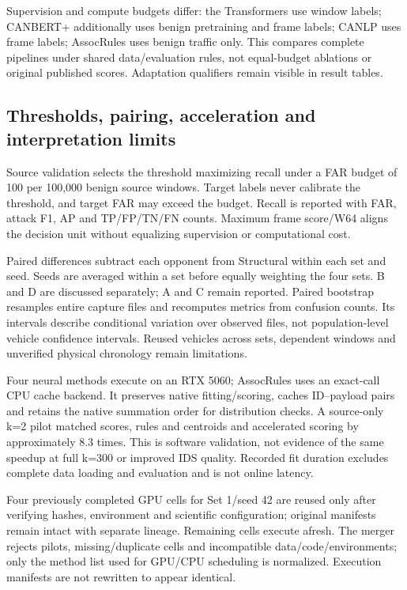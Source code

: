 \documentclass[12pt,a4paper,oneside,openany]{extbook}
\begin{document}
Supervision and compute budgets differ: the Transformers use window labels; CANBERT+ additionally uses benign pretraining and frame labels; CANLP uses frame labels; AssocRules uses benign traffic only. This compares complete pipelines under shared data/evaluation rules, not equal-budget ablations or original published scores. Adaptation qualifiers remain visible in result tables.

\subsection{Thresholds, pairing, acceleration and interpretation limits}
Source validation selects the threshold maximizing recall under a FAR budget of 100 per 100,000 benign source windows. Target labels never calibrate the threshold, and target FAR may exceed the budget. Recall is reported with FAR, attack F1, AP and TP/FP/TN/FN counts. Maximum frame score/W64 aligns the decision unit without equalizing supervision or computational cost.

Paired differences subtract each opponent from Structural within each set and seed. Seeds are averaged within a set before equally weighting the four sets. B and D are discussed separately; A and C remain reported. Paired bootstrap resamples entire capture files and recomputes metrics from confusion counts. Its intervals describe conditional variation over observed files, not population-level vehicle confidence intervals. Reused vehicles across sets, dependent windows and unverified physical chronology remain limitations.

Four neural methods execute on an RTX 5060; AssocRules uses an exact-call CPU cache backend. It preserves native fitting/scoring, caches ID--payload pairs and retains the native summation order for distribution checks. A source-only k=2 pilot matched scores, rules and centroids and accelerated scoring by approximately 8.3 times. This is software validation, not evidence of the same speedup at full k=300 or improved IDS quality. Recorded fit duration excludes complete data loading and evaluation and is not online latency.

Four previously completed GPU cells for Set 1/seed 42 are reused only after verifying hashes, environment and scientific configuration; original manifests remain intact with separate lineage. Remaining cells execute afresh. The merger rejects pilots, missing/duplicate cells and incompatible data/code/environments; only the method list used for GPU/CPU scheduling is normalized. Execution manifests are not rewritten to appear identical.
\end{document}
